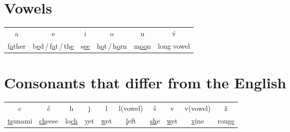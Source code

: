 \section*{Vowels}

\begin{tabular}{cccccc}
a & e & i & o & u & \'{v} \\
f\underline{a}ther & b\underline{e}d\,/\,f\underline{a}t\,/\,th\underline{e} & s\underline{ee} & h\underline{o}t\,/\,h\underline{o}rn & m\underline{oo}n & long vowel \\
\end{tabular}


\section*{Consonants that differ from the English}

\begin{tabular}{cccccccccc}
c                   & \v{c}              & h               & j    & l & l(vowel)           & \v{s} & v & v(vowel) & \v{z}\\
\underline{ts}unami & \underline{ch}eese & lo\underline{ch} & \underline{y}et & \underline{w}et & \underline{l}eft & \underline{sh}e & \underline{w}et & \underline{v}ine & rou\underline{ge} \\
\end{tabular}


